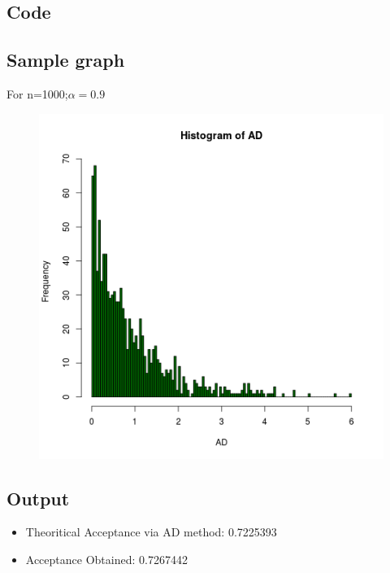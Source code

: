 \documentclass[11pt]{article}
\begin{document}
\subsection{Code}

\subsection{Sample graph}
For n=1000;$\alpha=0.9$
\begin{figure}[H]
\centering
\includegraphics[scale=.65]{image1}
\end{figure}
\subsection{Output}
\begin{itemize}
\item Theoritical Acceptance via AD method: 0.7225393 
\item Acceptance Obtained: 0.7267442 
\end{itemize}
\end{document}
